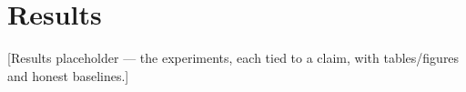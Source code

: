 \section{Results}
[Results placeholder — the experiments, each tied to a claim, with tables/figures and honest baselines.]
